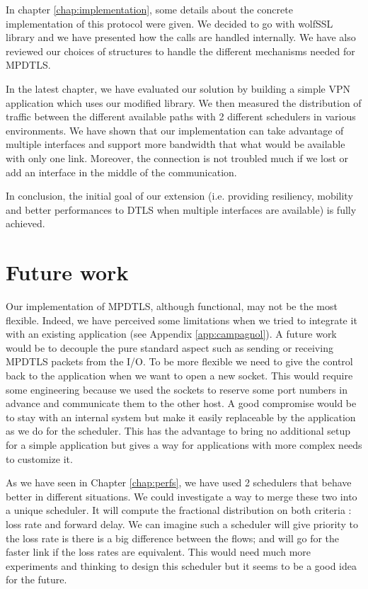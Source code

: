 In chapter \ref{chap:implementation}, some details about the concrete implementation of this protocol were given. We decided to go with wolfSSL library and we have presented how the calls are handled internally. We have also reviewed our choices of structures to handle the different mechanisms needed for MPDTLS.

In the latest chapter, we have evaluated our solution by building a simple VPN application which uses our modified library. We then measured the distribution of traffic between the different available paths with 2 different schedulers in various environments. We have shown that our implementation can take advantage of multiple interfaces and support more bandwidth that what would be available with only one link. Moreover, the connection is not troubled much if we lost or add an interface in the middle of the communication.

In conclusion, the initial goal of our extension (i.e. providing resiliency, mobility and better performances to DTLS when multiple interfaces are available) is fully achieved.


\section{Future work}

Our implementation of MPDTLS, although functional, may not be the most flexible. Indeed, we have perceived some limitations when we tried to integrate it with an existing application (see Appendix \ref{app:campagnol}). A future work would be to decouple the pure standard aspect such as sending or receiving MPDTLS packets from the I/O. To be more flexible we need to give the control back to the application when we want to open a new socket. This would require some engineering because we used the sockets to reserve some port numbers in advance and communicate them to the other host. A good compromise would be to stay with an internal system but make it easily replaceable by the application as we do for the scheduler. This has the advantage to bring no additional setup for a simple application but gives a way for applications with more complex needs to customize it.

As we have seen in Chapter \ref{chap:perfs}, we have used 2 schedulers that behave better in different situations. We could investigate a way to merge these two into a unique scheduler. It will compute the fractional distribution on both criteria : loss rate and forward delay. We can imagine such a scheduler will give priority to the loss rate is there is a big difference between the flows; and will go for the faster link if the loss rates are equivalent. This would need much more experiments and thinking to design this scheduler but it seems to be a good idea for the future.

